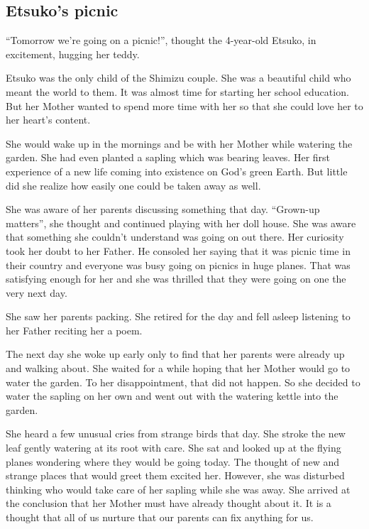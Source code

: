 \documentclass[twoside,11pt]{article}
\begin{document}
\thispagestyle{plain}
\tableofcontents
\newpage
\begin{center}
  \section{Etsuko's picnic}
\end{center}
\bigskip
\bigskip
\bigskip
``Tomorrow we're going on a picnic!'', thought the 4-year-old Etsuko, in excitement, hugging her teddy.

Etsuko was the only child of the Shimizu couple. She was a beautiful child who meant the world to them. It was almost time for starting her school education. But her Mother wanted to spend more time with her so that she could love her to her heart's content.

She would wake up in the mornings and be with her Mother while watering the garden. She had even planted a sapling which was bearing leaves. Her first experience of a new life coming into existence on God's green Earth. But little did she realize how easily one could be taken away as well.

She was aware of her parents discussing something that day. ``Grown-up matters'', she thought and continued playing with her doll house. She was aware that something she couldn't understand was going on out there. Her curiosity took her doubt to her Father. He consoled her saying that it was picnic time in their country and everyone was busy going on picnics in huge planes. That was satisfying enough for her and she was thrilled that they were going on one the very next day.

She saw her parents packing. She retired for the day and fell asleep listening to her Father reciting her a poem.

The next day she woke up early only to find that her parents were already up and walking about. She waited for a while hoping that her Mother would go to water the garden. To her disappointment, that did not happen. So she decided to water the sapling on her own and went out with the watering kettle into the garden.

She heard a few unusual cries from strange birds that day. She stroke the new leaf gently watering at its root with care. She sat and looked up at the flying planes wondering where they would be going today. The thought of new and strange places that would greet them excited her. However, she was disturbed thinking who would take care of her sapling while she was away. She arrived at the conclusion that her Mother must have already thought about it. It is a thought that all of us nurture that our parents can fix anything for us.
\end{document}
